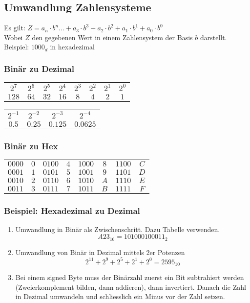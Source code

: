 \subsection{Umwandlung Zahlensysteme}
	Es gilt: $Z = a_n \cdot b^n ... + a_3 \cdot b^3 + a_2 \cdot b^2 + a_1 \cdot b^1 + a_0 \cdot b^0$ \\
	Wobei $Z$ den gegebenen Wert in einem Zahlensystem der Basis $b$ darstellt. \\
	Beispiel: $1000_d$ in hexadezimal
\subsubsection{Binär zu Dezimal}
\begin{center}
    \begin{tabular}{c|c|c|c|c|c|c|c}
        $2^7$ & $2^6$ & $2^5$ & $2^4$ & $2^3$ & $2^2$ & $2^1$ & $2^0$\\
        $128$ & $64$ & $32$ & $16$ & $8$ & $4$ & $2$ & $1$
    \end{tabular}
\end{center}
\begin{center}
    \begin{tabular}{c|c|c|c}
        $2^{-1}$ & $2^{-2}$ & $2^{-3}$ & $2^{-4}$\\
        $0.5$ & $0.25$ & $0.125$ & $0.0625$
    \end{tabular}
\end{center}

\subsubsection{Binär zu Hex}
\begin{center}
    \begin{tabular}{c c||c c||c c||c c}
        $0000$ & $0$ & $0100$ & $4$ & $1000$ & $8$ & $1100$ & $C$\\
        $0001$ & $1$ & $0101$ & $5$ & $1001$ & $9$ & $1101$ & $D$\\
        $0010$ & $2$ & $0110$ & $6$ & $1010$ & $A$ & $1110$ & $E$\\
        $0011$ & $3$ & $0111$ & $7$ & $1011$ & $B$ & $1111$ & $F$\\
    \end{tabular}
\end{center}

\subsubsection{Beispiel: Hexadezimal zu Dezimal}
\begin{enumerate}
    \item Umwandlung in Binär als Zwischenschritt. Dazu Tabelle verwenden.
    \[
        A23_{16} = 1010 0010 0011_2
    \]
    \item Umwandlung von Binär in Dezimal mittels 2er Potenzen
    \[
        2^{11}+2^9+2^5+2^1+2^0 = 2595_{10}
    \] 
    \item Bei einem signed Byte muss der Binärzahl zuerst ein Bit subtrahiert werden (Zweierkomplement bilden, dann addieren), dann invertiert. Danach die Zahl in Dezimal umwandeln und schliesslich ein Minus vor der Zahl setzen.
\end{enumerate}

